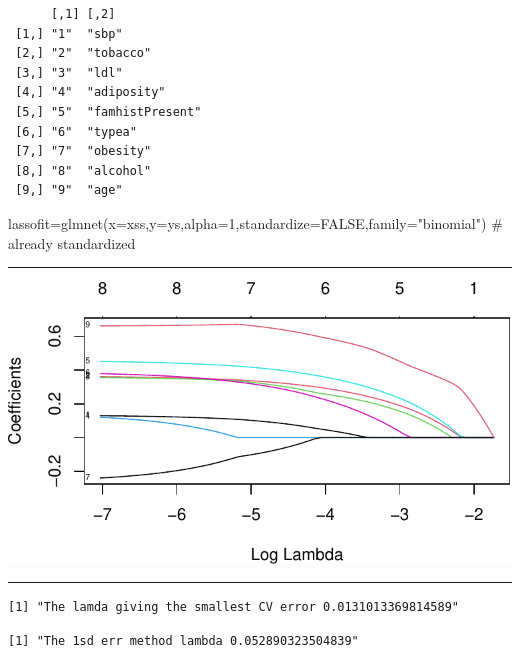 \documentclass[
  letterpaper,
  DIV=11,
  numbers=noendperiod]{scrartcl}
\newenvironment{Shaded}{\begin{snugshade}}{\end{snugshade}}
\newcommand{\AttributeTok}[1]{\textcolor[rgb]{0.40,0.45,0.13}{#1}}
\newcommand{\CommentTok}[1]{\textcolor[rgb]{0.37,0.37,0.37}{#1}}
\newcommand{\ConstantTok}[1]{\textcolor[rgb]{0.56,0.35,0.01}{#1}}
\newcommand{\DecValTok}[1]{\textcolor[rgb]{0.68,0.00,0.00}{#1}}
\newcommand{\FunctionTok}[1]{\textcolor[rgb]{0.28,0.35,0.67}{#1}}
\newcommand{\NormalTok}[1]{\textcolor[rgb]{0.00,0.23,0.31}{#1}}
\newcommand{\OtherTok}[1]{\textcolor[rgb]{0.00,0.23,0.31}{#1}}
\newcommand{\StringTok}[1]{\textcolor[rgb]{0.13,0.47,0.30}{#1}}
\begin{document}
\begin{verbatim}
      [,1] [,2]            
 [1,] "1"  "sbp"           
 [2,] "2"  "tobacco"       
 [3,] "3"  "ldl"           
 [4,] "4"  "adiposity"     
 [5,] "5"  "famhistPresent"
 [6,] "6"  "typea"         
 [7,] "7"  "obesity"       
 [8,] "8"  "alcohol"       
 [9,] "9"  "age"           
\end{verbatim}

\begin{Shaded}
\begin{Highlighting}[]
\NormalTok{lassofit}\OtherTok{=}\FunctionTok{glmnet}\NormalTok{(}\AttributeTok{x=}\NormalTok{xss,}\AttributeTok{y=}\NormalTok{ys,}\AttributeTok{alpha=}\DecValTok{1}\NormalTok{,}\AttributeTok{standardize=}\ConstantTok{FALSE}\NormalTok{,}\AttributeTok{family=}\StringTok{"binomial"}\NormalTok{) }\CommentTok{\# already standardized}
\end{Highlighting}
\end{Shaded}

\begin{center}\rule{0.5\linewidth}{0.5pt}\end{center}

\includegraphics{L10_files/figure-pdf/unnamed-chunk-14-1.pdf}

\begin{center}\rule{0.5\linewidth}{0.5pt}\end{center}

\begin{verbatim}
[1] "The lamda giving the smallest CV error 0.0131013369814589"
\end{verbatim}

\begin{verbatim}
[1] "The 1sd err method lambda 0.052890323504839"
\end{verbatim}
\end{document}
